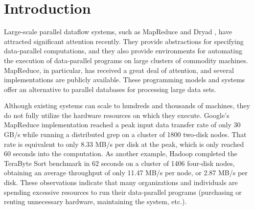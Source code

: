 \documentclass{acm_proc_article-sp}
\begin{document}
\section{Introduction}
Large-scale parallel dataflow systems, such as MapReduce \cite{mapreduce} and Dryad \cite{dryad}, have attracted significant attention recently. They provide abstractions for specifying data-parallel computations, and they also provide environments for automating the execution of data-parallel programs on large clusters of commodity machines. MapReduce, in particular, has received a great deal of attention, and several implementations \cite{hadoop, phoenix} are publicly available. These programming models and systems offer an alternative to parallel databases \cite{paralleldatabases} for processing large data sets.

Although existing systems can scale to hundreds and thousands of machines, they do not fully utilize the hardware resources on which they execute. Google's MapReduce implementation reached a peak input data transfer rate of only 30 GB/s while running a distributed grep on a cluster of 1800 two-disk nodes. That rate is equivalent to only 8.33 MB/s per disk at the peak, which is only reached 60 seconds into the computation. As another example, Hadoop completed \cite{hadoop2009} the TeraByte Sort benchmark \cite{sortbenchmark} in 62 seconds on a cluster of 1406 four-disk nodes, obtaining an average throughput of only 11.47 MB/s per node, or 2.87 MB/s per disk. These observations indicate that many organizations and individuals are spending excessive resources to run their data-parallel programs (purchasing or renting unnecessary hardware, maintaining the system, etc.).
\end{document}
